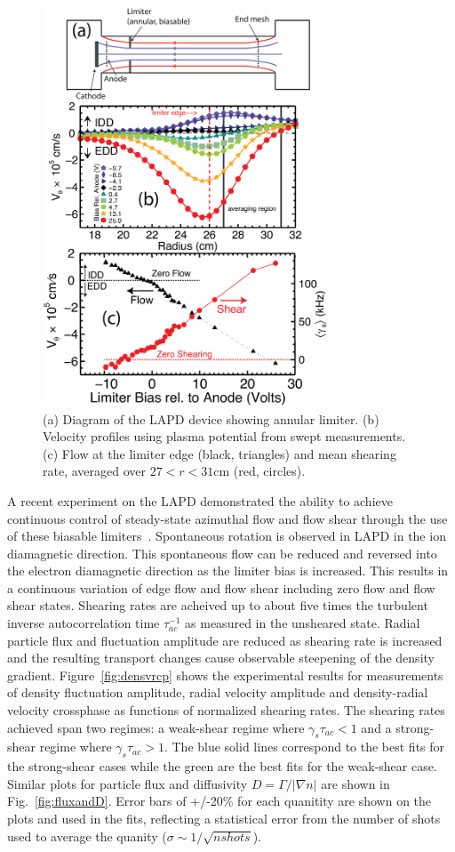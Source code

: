 \documentclass[aip,pop,amsmath,amssymb,preprint,superscriptaddress]{revtex4-1} %
\begin{document}
\begin{figure}[!htbp]
\centerline{
\includegraphics[width=8.5cm]{figure1.eps}}
\caption{\label{fig:velocity_flowshear} (a) Diagram of the LAPD device showing annular limiter.  (b) Velocity profiles using plasma potential from swept measurements. (c) Flow at the limiter edge (black, triangles) and mean shearing rate, averaged over $27 < r < 31$cm (red, circles).}
\end{figure}

A recent experiment on the LAPD demonstrated the ability to achieve continuous control of steady-state azimuthal flow and flow shear through the use of these biasable limiters~\cite{schaffner12}. Spontaneous rotation is observed in LAPD in the ion diamagnetic direction.  This spontaneous flow can be reduced and reversed into the  electron diamagnetic direction as the limiter bias is increased. This results in a continuous variation of edge flow and flow shear including zero flow and flow shear states. Shearing rates are acheived up to about five times the turbulent inverse autocorrelation time  $\tau_{ac}^{-1}$ as measured in the unsheared state. Radial particle flux and fluctuation amplitude are reduced as shearing rate is increased and the resulting transport changes cause observable steepening of the density gradient. Figure~\ref{fig:densvrcp} shows the experimental results for measurements of density fluctuation amplitude, radial velocity amplitude and density-radial velocity crossphase as functions of normalized shearing rates. The shearing rates achieved span two regimes: a weak-shear regime where $\gamma_{s}\tau_{ac} < 1$ and a strong-shear regime where $\gamma_{s}\tau_{ac} > 1$. The blue solid lines correspond to the best fits for the strong-shear cases while the green are the best fits for the weak-shear case.  Similar plots for particle flux and diffusivity $D = \Gamma/|\nabla n|$ are shown in Fig.~\ref{fig:fluxandD}.  Error bars of +/-20\% for each quanitity are shown on the plots and used in the fits, reflecting a statistical error from the number of shots used to average the quanity ($\sigma \sim 1/\sqrt{nshots}$).
\end{document}
